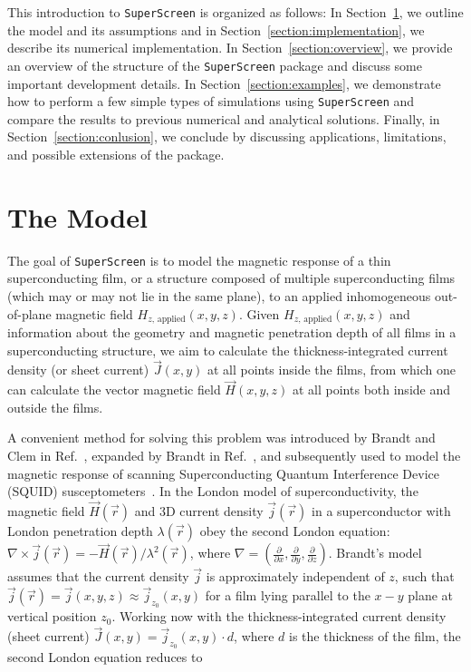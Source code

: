 \documentclass[final,3p,times]{elsarticle}
\newcommand{\inline}[1]{\texttt{#1}\xspace}
\newcommand{\SuperScreen}{\inline{SuperScreen}}
\newcounter{bla}
\begin{document}
This introduction to \SuperScreen is organized as follows: In Section~\ref{section:model}, we outline the model and its assumptions and in Section~\ref{section:implementation}, we describe its numerical implementation. In Section~\ref{section:overview}, we provide an overview of the structure of the \SuperScreen package and discuss some important development details. In Section~\ref{section:examples}, we demonstrate how to perform a few simple types of simulations using \SuperScreen and compare the results to previous numerical and analytical solutions. Finally, in Section~\ref{section:conlusion}, we conclude by discussing applications, limitations, and possible extensions of the package.

\section{The Model}
\label{section:model}

The goal of \SuperScreen is to model the magnetic response of a thin superconducting film, or a structure composed of multiple superconducting films (which may or may not lie in the same plane), to an applied inhomogeneous out-of-plane magnetic field
$H_{z,\,\mathrm{applied}}(x, y, z)$. Given $H_{z,\,\mathrm{applied}}(x, y, z)$ and information about the geometry and magnetic penetration depth of all films in a superconducting structure, we aim to calculate the thickness-integrated current density (or sheet current) $\vec{J}(x, y)$ at all points inside the films, from which one can calculate the vector magnetic field $\vec{H}(x, y, z)$ at all points both inside and outside the films.

A convenient method for solving this problem was introduced by Brandt and Clem in Ref.~\cite{Brandt2004-ew}, expanded by Brandt in Ref.~\cite{Brandt2005-wj}, and subsequently used to model the magnetic response of scanning Superconducting Quantum Interference Device (SQUID) susceptometers~\cite{Kirtley2016-zz, Kirtley2016-gt}. In the London model of superconductivity, the magnetic field $\vec{H}(\vec{r})$ and 3D current density $\vec{j}(\vec{r})$ in a superconductor with London penetration depth $\lambda(\vec{r})$ obey the second London equation:
$\nabla\times\vec{j}(\vec{r})=-\vec{H}(\vec{r})/\lambda^2(\vec{r})$, where
$\nabla=\left(\frac{\partial}{\partial x}, \frac{\partial}{\partial y}, \frac{\partial}{\partial z}\right)$. Brandt's model assumes that the current density $\vec{j}$ is approximately independent of $z$, such that  $\vec{j}(\vec{r}) = \vec{j}(x, y, z)\approx\vec{j}_{z_0}(x, y)$ for a film lying parallel to the $x-y$ plane at vertical position $z_0$. Working now with the thickness-integrated current density (sheet current) $\vec{J}(x, y)=\vec{j}_{z_0}(x, y)\cdot d$, where $d$
is the thickness of the film, the second London equation reduces to
\end{document}
